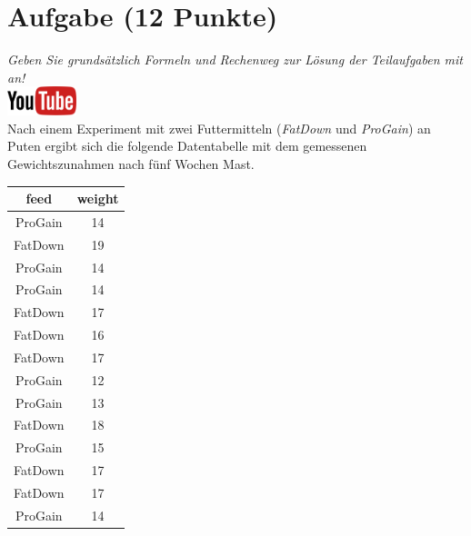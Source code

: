 \documentclass[a4paper, 10pt]{scrartcl}\usepackage[]{graphicx}\usepackage[]{xcolor}
\begin{document}
\section{Aufgabe \hfill (12 Punkte)}

\textit{Geben Sie grunds{\"a}tzlich Formeln und Rechenweg zur L{\"o}sung der
  Teilaufgaben mit an!} \\[1Ex]

\hfill\href{https://youtu.be/TbSEOMCQYl4}{\includegraphics[width =
  2cm]{img/youtube}}\\[1Ex]

Nach einem Experiment mit zwei Futtermitteln (\textit{FatDown} und
\textit{ProGain}) an Puten ergibt sich die folgende Datentabelle mit dem gemessenen
Gewichtszunahmen nach f{\"u}nf Wochen Mast.

\begin{table}[!h]
\centering
\begin{tabular}{cc}
\toprule
feed & weight\\
\midrule
ProGain & 14\\
FatDown & 19\\
ProGain & 14\\
ProGain & 14\\
FatDown & 17\\
\addlinespace
FatDown & 16\\
FatDown & 17\\
ProGain & 12\\
ProGain & 13\\
FatDown & 18\\
\addlinespace
ProGain & 15\\
FatDown & 17\\
FatDown & 17\\
ProGain & 14\\
\bottomrule
\end{tabular}
\end{table}
\end{document}
